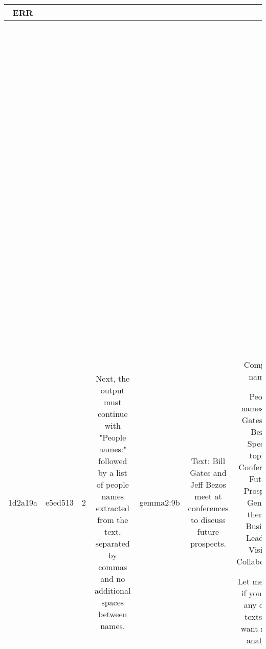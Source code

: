 \begin{table}[h!]
\begin{tabular}{|c|c|c|c|c|c|c|c|c|c|}
ERR & \\
\hline
1d2a19a & e5ed513 & 2 & Next, the output must continue with "People names:" followed by a list of people names extracted from the text, separated by commas and no additional spaces between names. & gemma2:9b & Text: Bill Gates and Jeff Bezos meet at conferences to discuss future prospects. & Company names:  

People names: Bill Gates, Jeff Bezos 
Specific topics: Conferences, Future Prospects
General themes: Business Leaders, Vision, Collaboration 


Let me know if you have any other texts you want me to analyze! & err & The chatbot output does not comply with the description provided. According to the description, the chatbot is required to extract entities in the following specific order and format: Company names, People names, Specific topics, General themes. In the output provided, the 'Company names' section is empty without any explanation — while it may be acceptable if there were no company names in the input text, there is no indication of such in the output provided.

Furthermore, the format asks for company names in a comma-separated list, but since the field is empty, it doesn't comply with the requested format.

Thus, due to the evident missing information in "Company names", the format specified in the description is not being followed as per the provided output.

ERR & \\
\hline
3594746 & e5ed513 & 3 & Then, the output must include "Specific topics:" followed by a list of specific topics that are relevant and directly mentioned in the text, separated by commas and no additional spaces between topics. & gemma2:9b & Text: The stock market crash and the rise of AI are significant topics nowadays. & Company names: 
People names: 
Specific topics: stock market, AI (artificial intelligence) 
General themes: technology disruption, economic uncertainty  


Let me know if you'd like me to analyze any other texts!  
 & err & The chatbot output is not complying with the description due to several issues:

1. The desired format specifies extracting "company names" and "people names." The chatbot output has left the sections for "Company names" and "People names" empty. While it's possible that there might not be any to extract without the actual text, it should be verified with input whether this is the case. However, this cannot be evaluated without the text, so this part of the compliance check can be ignored.


\end{tabular}
\end{table}
